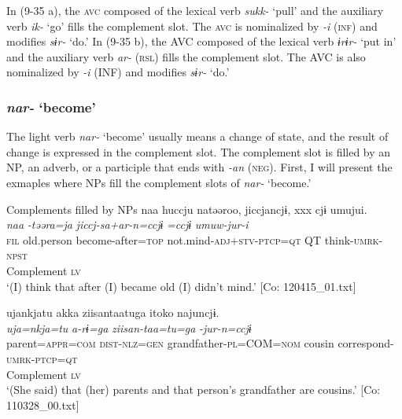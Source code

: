 In (9-35 a), the \textsc{avc} composed of the lexical verb \textit{sukk-} ‘pull’ and the auxiliary verb \textit{ik-} ‘go’ fills the complement slot. The \textsc{avc} is nominalized by \textit{{}-i} (\textsc{inf}) and modifies \textit{sɨr-} ‘do.’ In (9-35 b), the AVC composed of the lexical verb \textit{ɨrɨr-} ‘put in’ and the auxiliary verb \textit{ar-} (\textsc{rsl}) fills the complement slot. The AVC is also nominalized by \textit{{}-i} (INF) and modifies \textit{sɨr-} ‘do.’

\subsubsection{\textit{nar-} ‘become’}\label{sec:9.1.2.2}

The light verb \textit{nar-} ‘become’ usually means a change of state, and the result of change is expressed in the complement slot. The complement slot is filled by an NP, an adverb, or a participle that ends with \textit{{}-an} (\textsc{neg}). First, I will present the exmaples where NPs fill the complement slots of \textit{nar-} ‘become.’

\ea   Complements filled by NPs \label{ex:9.36}
\ea %
 \gllll  naa  huccju  natəəroo,  jiccjancjɨ,                                       xxx  cjɨ  umujui.  \\
      \textit{naa}  \textit{}  \textit{-təəra=ja}  \textit{jiccj-sa+ar-n=ccjɨ}     {}        \textit{=ccjɨ}  \textit{umuw-jur-i}  \\
      \textsc{fil}  old.person  become-after=\textsc{top}  not.mind-\textsc{adj}+\textsc{stv}-\textsc{ptcp}=\textsc{qt}          {}                  QT  think-\textsc{umrk}-\textsc{npst}  \\
      {}  Complement  \textsc{lv}  \\
      \glt       ‘(I) think that after (I) became old (I) didn’t mind.’ [Co: 120415\_01.txt]

\ex \label{ex:9.36b} %
    \gllll  ujankjatu  akka  ziisantaatuga    {\textbar}itoko{\textbar}  najuncjɨ.\\
      \textit{uja=nkja=tu}  \textit{a-rɨ=ga}  \textit{ziisan-taa=tu=ga}   \textit{}  \textit{-jur-n=ccjɨ}\\
      parent=\textsc{appr}=\textsc{com}  \textsc{dist}-\textsc{nlz}=\textsc{gen}  grandfather-\textsc{pl}=COM=\textsc{nom}  cousin  correspond-\textsc{umrk}-\textsc{ptcp}=\textsc{qt}\\
          {}            {}          {}                       Complement  \textsc{lv}\\
      \glt       ‘(She said) that (her) parents and that person’s grandfather are cousins.’ [Co: 110328\_00.txt]

